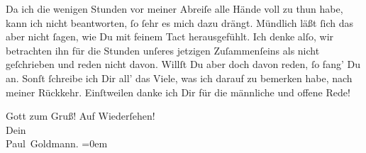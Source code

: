 \pstart
           {\pb}Da ich die wenigen Stunden vor meiner Abreiſe alle
               Hände voll zu thun habe, kann ich \label{K_L02650-4v}\label{K_L02650-4}
               nicht beantworten,{ }ſo{ }ſehr  es mich dazu drängt.
               Mündlich läßt{ }ſich das aber nicht{ }ſagen, wie Du mit feinem Tact herausgefühlt. Ich
               denke alſo, wir betrachten ihn für die Stunden unſeres jetzigen Zuſammenſeins als
               nicht geſchrieben und reden nicht davon. Willſt Du aber doch davon reden,{ }ſo fang’ Du
               an. Sonſt{ }ſchreibe ich Dir all’ das Viele, was ich darauf zu bemerken habe, nach
               meiner Rückkehr. Einſtweilen danke ich Dir für die männliche und offene Rede!\pend
           
\pstart
           Gott zum Gruß! Auf Wiederſehen! {\\[\baselineskip]} Dein {\\[\baselineskip]}\spacefill\mbox{Paul Goldmann.}\pend
           \leftskip=0em{}\endnumbering{}  \newcommand{\dateiname}{L02650}\newcommand{\titel}{Paul Goldmann an Arthur Schnitzler, 25. 9. 1890}\newcommand{\editorInnen}{Martin Anton Müller und Laura Untner}
